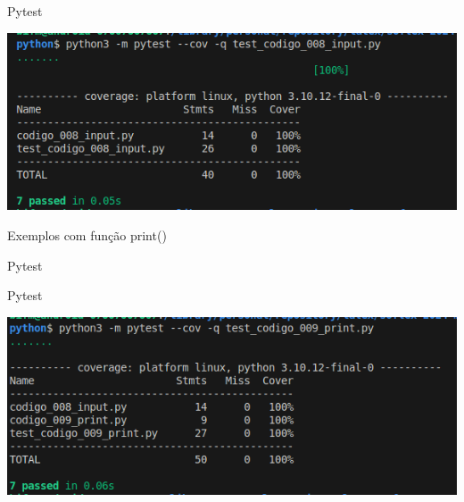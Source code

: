 \begin{frame}[t]{Pytest}

	\vspace{1em}
	\centering
	\includegraphics[scale=0.65]{imagens/fig-test-result-input.png}
	
\end{frame}



\begin{frame}[t]{Exemplos com função print()}	
	
	\vspace{3em}
	
	
\end{frame}

\begin{frame}[t]{Pytest}
	\vspace{-1em}
	
	
\end{frame}

\begin{frame}[t]{Pytest}
	
	\vspace{1em}
	\centering
	\includegraphics[scale=0.65]{imagens/fig-test-result-print.png}
	
\end{frame}






